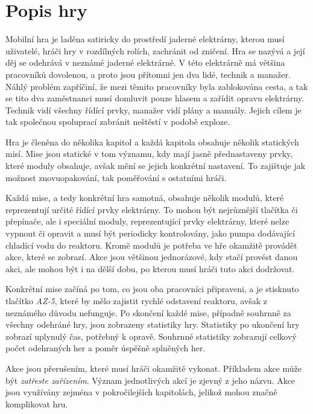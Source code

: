 \section{Popis hry}

Mobilní hra je laděna satiricky do prostředí jaderné elektrárny,
kterou musí uživatelé,
hráči hry v rozdílných rolích,
zachránit od zničení.
Hra se nazývá \emph{\myAppName}
a její děj se odehrává v neznámé jaderné elektrárně.
V této elektrárně má většina pracovníků dovolenou,
a proto jsou přítomni jen dva lidé,
technik a manažer.
Náhlý problém zapříčiní,
že mezi těmito pracovníky byla zablokována cesta,
a tak se tito dva zaměstnanci musí domluvit pouze hlasem
a zařídit opravu elektrárny.
Technik vidí všechny řídící prvky,
manažer vidí plány a manuály.
Jejich cílem je tak společnou spoluprací zabránit neštěstí v podobě exploze. 

Hra je členěna do několika kapitol
a každá kapitola obsahuje několik statických misí.
Mise jsou statické v tom významu,
kdy mají jasně přednastaveny prvky,
které moduly obsahuje,
avšak mění se jejich konkrétní nastavení.
To zajištuje jak možnost znovuopakování,
tak poměřování s ostatními hráči.

Každá mise,
a tedy konkrétní hra samotná,
obsahuje několik modulů,
které reprezentují určité řídící prvky elektrárny.
To mohou být nejrůznější tlačítka či přepínače,
ale i speciální moduly,
reprezentující prvky elektrárny,
které nelze vypnout či opravit a musí být periodicky kontrolovány,
jako pumpa dodávající chladící vodu do reaktoru.
Kromě modulů je potřeba ve hře okamžitě provádět akce,
které se zobrazí.
Akce jsou většinou jednorázové,
kdy stačí provést danou akci,
ale mohou být i na dělší dobu,
po kterou musí hráči tuto akci dodržovat.

Konkrétní mise začíná po tom,
co jsou oba pracovníci připraveni,
a je stisknuto tlačítko \emph{AZ-5},
které by mělo zajistit rychlé odstavení reaktoru,
avšak z neznámého důvodu nefunguje.
Po skončení každé mise,
případně souhrnně za všechny odehráné hry,
jsou zobrazeny statistiky hry.
Statistiky po ukončení hry zobrazí uplynulý čas,
potřebný k opravě.
Souhrnné statistiky zobrazují
celkový počet odehraných her a poměr úspěšně splněných her.

Akce jsou přerušením,
které musí hráči okamžitě vykonat.
Příkladem akce může být \emph{zatřeste zařízením}.
Význam jednotlivých akcí je zjevný z jeho názvu.
Akce jsou využívány zejména v pokročilejších kapitolách,
jelikož mohou značně komplikovat hru.
